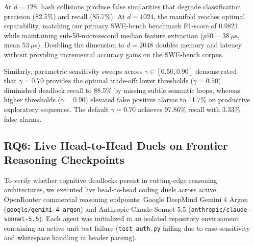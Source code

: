 \documentclass[journal]{IEEEtran}
\begin{document}
At $d = 128$, hash collisions produce false similarities that degrade classification precision (82.5\%) and recall (85.7\%). At $d = 1024$, the manifold reaches optimal separability, matching our primary SWE-bench benchmark F1-score of 0.9821 while maintaining sub-50-microsecond median feature extraction ($p50 = 38\ \mu\text{s}$, mean $53\ \mu\text{s}$). Doubling the dimension to $d = 2048$ doubles memory and latency without providing incremental accuracy gains on the SWE-bench corpus.

Similarly, parametric sensitivity sweeps across $\gamma \in [0.50, 0.90]$ demonstrated that $\gamma = 0.70$ provides the optimal trade-off: lower thresholds ($\gamma = 0.50$) diminished deadlock recall to 88.5\% by missing subtle semantic loops, whereas higher thresholds ($\gamma = 0.90$) elevated false positive alarms to 11.7\% on productive exploratory sequences. The default $\gamma = 0.70$ achieves 97.86\% recall with 3.33\% false alarms.

\subsection{RQ6: Live Head-to-Head Duels on Frontier Reasoning Checkpoints}
\label{sec:live_duels}

To verify whether cognitive deadlocks persist in cutting-edge reasoning architectures, we executed live head-to-head coding duels across active OpenRouter commercial reasoning endpoints: Google DeepMind Gemini 4 Argon (\texttt{google/gemini-4-argon}) and Anthropic Claude Sonnet 5.5 (\texttt{anthropic/claude-sonnet-5.5}). Each agent was initialized in an isolated repository environment containing an active unit test failure (\texttt{test\_auth.py} failing due to case-sensitivity and whitespace handling in header parsing).

\begin{table}[!t]
\caption{Live End-to-End Coding Duel Telemetry on Frontier Reasoning Endpoints}
\label{tab:live_duels}
\centering
{}
\end{table}
\end{document}
